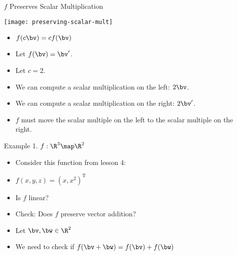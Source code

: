 \documentclass{beamer}
\begin{document}
\begin{frame}{$f$ Preserves Scalar Multiplication}

\begin{center}
\texttt{[image: preserving-scalar-mult]}
\end{center}

\begin{itemize}
\item $f(c \bv) = c f(\bv)$
\item Let $f(\bv) = \bv^{\prime}$.
\item Let $c = 2$.
\item We can compute a scalar multiplication on the left: $2 \bv$.
\item We can compute a scalar multiplication on the right: $2 \bv^{\prime}$.
\item $f$ must move the scalar multiple on the left to the scalar multiple on the right.
\end{itemize}

\end{frame}


\begin{frame}{Example 1. $f:\R^3\map\R^2$}

\begin{itemize}
\item Consider this function from lesson 4:
\item $f(x,y,z) = (x, x^2)^{\text{T}}$
\item Is $f$ linear?
\item Check: Does $f$ preserve vector addition?
\item Let $\bv, \bw \in \R^2$
\item We need to check if $f(\bv + \bw) = f(\bv) + f(\bw)$
\end{itemize}

\end{frame}


\beamerdefaultoverlayspecification{}
\end{document}
